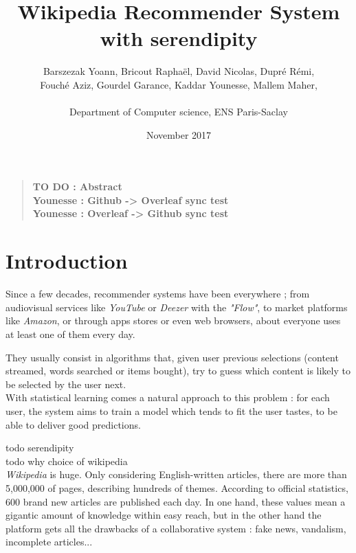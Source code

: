\documentclass[11pt]{article}
\title{Wikipedia Recommender System with serendipity}
\author
    {
      Barszezak Yoann, Bricout Rapha\"el, David Nicolas, Dupr\'e R\'emi,\\
      Fouch\'e Aziz, Gourdel Garance, Kaddar Younesse, Mallem Maher,\\
      \\
      \normalsize{Department of Computer science, ENS Paris-Saclay}\\
    }
\date{November 2017}
\theoremstyle{plain}
\theoremstyle{definition}
\theoremstyle{remark}
\newenvironment{sciabstract}{
\begin{quote} \bf}
{\end{quote}}
\begin{document}
 


\baselineskip10pt


\maketitle 




\begin{sciabstract}
  TO DO : Abstract\\
  Younesse : Github -> Overleaf sync test\\
  Younesse : Overleaf -> Github sync test
\end{sciabstract}


\tableofcontents


\section*{Introduction}

Since a few decades, recommender systems have been everywhere ; from audiovisual services like \textit{YouTube} or \textit{Deezer} with the \textit{"Flow"}, to market platforms like \textit{Amazon}, or through apps stores or even web browsers, about everyone uses at least one of them every day. 

They usually consist in algorithms that, given user previous selections (content streamed, words searched or items bought), try to guess which content is likely to be selected by the user next. \\

With statistical learning comes a natural approach to this problem : for each user, the system aims to train a model which tends to fit the user tastes, to be able to deliver good predictions. 

todo serendipity \\

todo why choice of wikipedia\\

\textit{Wikipedia} is huge. Only considering English-written articles, there are more than 5,000,000 of pages, describing hundreds of themes. According to official statistics, 600 brand new articles are published each day. In one hand, these values mean a gigantic amount of knowledge within easy reach, but in the other hand the platform gets all the drawbacks of a collaborative system : fake news, vandalism, incomplete articles... 
\end{document}
